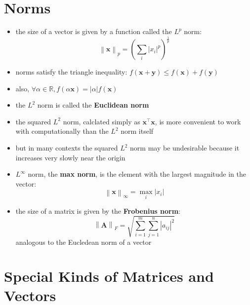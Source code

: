 \documentclass[11pt,twocolumn]{report}
\def\realnumbers{\mathbb{R}}
\newcommand{\norm}[1]{\left\lVert#1\right\rVert}
\begin{document}
\section{Norms}
\begin{itemize}
  \item the size of a vector is given by a function called the $L^p$ norm:
    \begin{equation}
      \norm{\bm{x}}_p = (\sum_i {\lvert x_i \rvert}^p)^{\frac{1}{p}}
    \end{equation}
  \item norms satisfy the triangle inequality: $f(\bm{x} + \bm{y}) \leq
    f(\bm{x}) + f(\bm{y})$
  \item also, $\forall \alpha \in \realnumbers, f(\alpha\bm{x}) =
    |\alpha|f(\bm{x})$
  \item the $L^2$ norm is called the \textbf{Euclidean norm}
  \item the squared $L^2$ norm, calclated simply as $\bm{x}^\intercal\bm{x}$, is
    more convenient to work with computationally than the $L^2$ norm itself
  \item but in many contexts the squared $L^2$ norm may be undesirable because
    it increases very slowly near the origin
  \item $L^\infty$ norm, the \textbf{max norm}, is the element with the largest
    magnitude in the vector:
    \begin{equation}
      \norm{\bm{x}}_\infty = \max_i |x_i|
    \end{equation}
  \item the size of a matrix is given by the \textbf{Frobenius norm}:
    \begin{equation}
      \norm{\bm{A}}_F = \sqrt{\sum_{i=1}^m\sum_{j=1}^n|a_{ij}|^2}
    \end{equation}
    analogous to the Eucledean norm of a vector
\end{itemize}

\section{Special Kinds of Matrices and Vectors}
\end{document}
